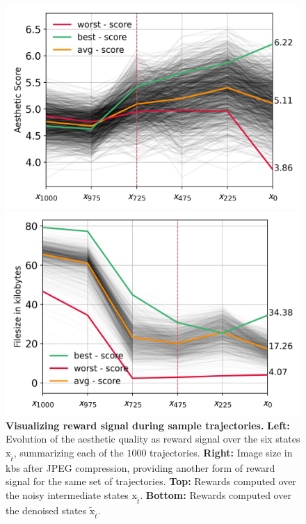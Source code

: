 \begin{figure}[ht]
  \begin{minipage}{0.5\textwidth}
      \centering
      \includegraphics[width=1\textwidth]{img/results/1k-denoise-trajectories-aestheic-score-single.png} %
  \end{minipage}\hfill
  \begin{minipage}{0.5\textwidth}
      \centering
      \includegraphics[width=1\textwidth]{img/results/1k-denoise-trajectories-jpeg-size-single.png} %
  \end{minipage}
  \vspace{-8pt}  %
    \captionsetup{width=\textwidth} %
    \caption{\textbf{Visualizing reward signal during sample trajectories.} \textbf{Left:} Evolution of the aesthetic quality as reward signal over the six states $\mathrm{x}_{\tilde{t}}$, summarizing each of the $1000$ trajectories. \textbf{Right:} Image size in kbs after JPEG compression, providing another form of reward signal for the same set of trajectories. \textbf{Top:} Rewards computed over the noisy intermediate states $\mathrm{x}_{\tilde{t}}$. \textbf{Bottom:} Rewards computed over the denoised states $\tilde{\mathrm{x}}_{\tilde{t}}$.}
  \label{fig:samples-trajectory-rewards} %
\end{figure}

